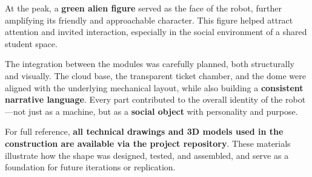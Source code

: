 At the peak, a \textbf{green alien figure} served as the face of the robot, further amplifying its friendly and approachable character. This figure helped attract attention and invited interaction, especially in the social environment of a shared student space.

The integration between the modules was carefully planned, both structurally and visually. The cloud base, the transparent ticket chamber, and the dome were aligned with the underlying mechanical layout, while also building a \textbf{consistent narrative language}. Every part contributed to the overall identity of the robot—not just as a machine, but as a \textbf{social object} with personality and purpose.

For full reference, \textbf{all technical drawings and 3D models used in the construction are available via the project repository}. These materials illustrate how the shape was designed, tested, and assembled, and serve as a foundation for future iterations or replication.
